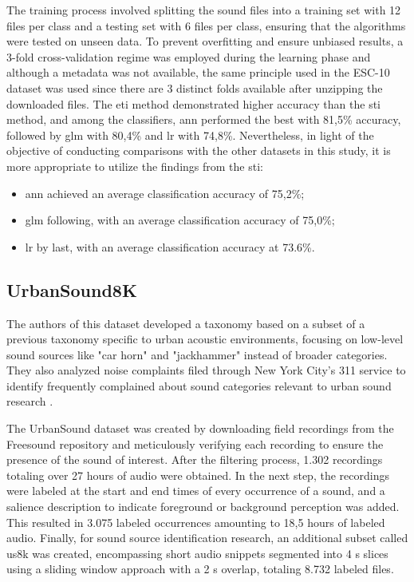 The training process involved splitting the sound files into a training set with 12 files per class and a testing set with 6 files per class, ensuring that the algorithms were tested on unseen data. To prevent overfitting and ensure unbiased results, a 3-fold cross-validation regime was employed during the learning phase and although a metadata was not available, the same principle used in the ESC-10 dataset was used since there are 3 distinct folds available after unzipping the downloaded files. The \gls{eti} method demonstrated higher accuracy than the \gls{sti} method, and among the classifiers, \gls{ann} performed the best with 81,5\% accuracy, followed by \gls{glm} with 80,4\% and \gls{lr} with 74,8\%. Nevertheless, in light of the objective of conducting comparisons with the other datasets in this study, it is more appropriate to utilize the findings from the \gls{sti}:

\begin{itemize}
    \item \gls{ann} achieved an average classification accuracy of  75,2\%;
    \item \gls{glm} following, with an average classification accuracy of 75,0\%;
    \item \gls{lr} by last, with an average classification accuracy at 73.6\%. 
\end{itemize}


\subsection{UrbanSound8K}
\label{subsec:dataset_US8K}

The authors of this dataset developed a taxonomy based on a subset of a previous taxonomy specific to urban acoustic environments, focusing on low-level sound sources like "car horn" and "jackhammer" instead of broader categories. They also analyzed noise complaints filed through New York City's 311 service to identify frequently complained about sound categories relevant to urban sound research \cite{Salamon2014}.

The UrbanSound dataset was created by downloading field recordings from the Freesound repository \cite{Font_freesound2013} and meticulously verifying each recording to ensure the presence of the sound of interest. After the filtering process, 1.302 recordings totaling over 27 hours of audio were obtained. In the next step, the recordings were labeled at the start and end times of every occurrence of a sound, and a salience description to indicate foreground or background perception was added. This resulted in 3.075 labeled occurrences amounting to 18,5 hours of labeled audio. Finally, for sound source identification research, an additional subset called \gls{us8k} was created, encompassing short audio snippets segmented into 4 \gls{s} slices using a sliding window approach with a 2 \gls{s} overlap, totaling 8.732 labeled files.

